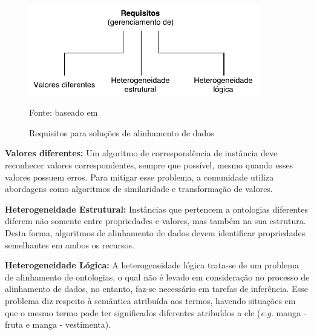 \begin{figure}[!ht]
	\centering
	\includegraphics[width=0.9\textwidth]{./imagens/im_requirements.pdf}
    \caption{Requisitos para soluções de alinhamento de dados}
	\footnotesize{Fonte: baseado em \cite{ferrara2008towards}}
	\label{fig:imrequirements}
\end{figure}

\textbf{Valores diferentes:}
% 
% 
%
%
Um algoritmo de correspondência de instância deve reconhecer valores correspondentes, sempre que possível, mesmo quando esses valores possuem erros. Para mitigar esse problema, a comunidade utiliza abordagens como algoritmos de similaridade e transformação de valores.


\textbf{Heterogeneidade Estrutural:}
Instâncias que pertencem a ontologias diferentes diferem não somente entre propriedades e valores, mas também na sua estrutura. Desta forma, algoritmos de alinhamento de dados devem identificar propriedades semelhantes em ambos os recursos.


\textbf{Heterogeneidade Lógica:}
% 
% 
%
%
A heterogeneidade lógica trata-se de um problema de alinhamento de ontologias, o qual não é levado em consideração no processo de alinhamento de dados, no entanto, faz-se necessário em tarefas de inferência. Esse problema diz respeito à semântica atribuída aos termos, havendo situações em que o mesmo termo pode ter significados diferentes atribuídos a ele (\textit{e.g.} manga - fruta e manga - vestimenta).

